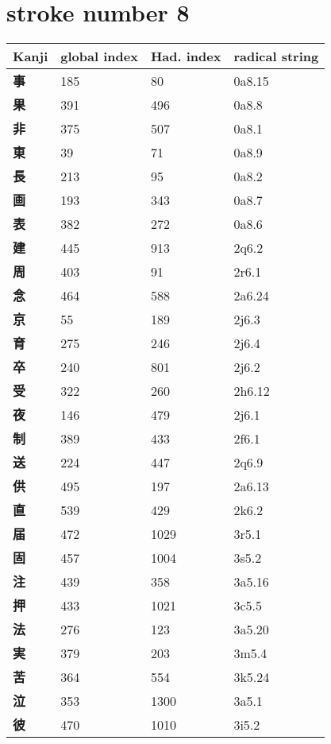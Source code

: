 \section{stroke number 8}
  \begin{longtable}[c]{llll}
    \bfseries Kanji & \bfseries global index & \bfseries Had. index & \bfseries radical string\\\hline\endhead
    \bfseries 事 & 185 & 80 & 0a8.15\\
    \bfseries 果 & 391 & 496 & 0a8.8\\
    \bfseries 非 & 375 & 507 & 0a8.1\\
    \bfseries 東 & 39 & 71 & 0a8.9\\
    \bfseries 長 & 213 & 95 & 0a8.2\\
    \bfseries 画 & 193 & 343 & 0a8.7\\
    \bfseries 表 & 382 & 272 & 0a8.6\\
    \bfseries 建 & 445 & 913 & 2q6.2\\
    \bfseries 周 & 403 & 91 & 2r6.1\\
    \bfseries 念 & 464 & 588 & 2a6.24\\
    \bfseries 京 & 55 & 189 & 2j6.3\\
    \bfseries 育 & 275 & 246 & 2j6.4\\
    \bfseries 卒 & 240 & 801 & 2j6.2\\
    \bfseries 受 & 322 & 260 & 2h6.12\\
    \bfseries 夜 & 146 & 479 & 2j6.1\\
    \bfseries 制 & 389 & 433 & 2f6.1\\
    \bfseries 送 & 224 & 447 & 2q6.9\\
    \bfseries 供 & 495 & 197 & 2a6.13\\
    \bfseries 直 & 539 & 429 & 2k6.2\\
    \bfseries 届 & 472 & 1029 & 3r5.1\\
    \bfseries 固 & 457 & 1004 & 3s5.2\\
    \bfseries 注 & 439 & 358 & 3a5.16\\
    \bfseries 押 & 433 & 1021 & 3c5.5\\
    \bfseries 法 & 276 & 123 & 3a5.20\\
    \bfseries 実 & 379 & 203 & 3m5.4\\
    \bfseries 苦 & 364 & 554 & 3k5.24\\
    \bfseries 泣 & 353 & 1300 & 3a5.1\\
    \bfseries 彼 & 470 & 1010 & 3i5.2\\

\end{longtable}
